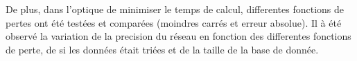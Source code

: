 De plus, dans l'optique de minimiser le temps de calcul,
differentes fonctions de pertes ont été testées et comparées
(moindres carrés et erreur absolue).
Il à été observé la variation de la precision du réseau en fonction des differentes fonctions de perte,
de si les données était triées et de la taille de la base de donnée.
